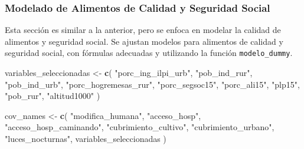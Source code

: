 \documentclass[
  12pt,
]{book}
\newenvironment{Shaded}{\begin{snugshade}}{\end{snugshade}}
\newcommand{\FunctionTok}[1]{\textcolor[rgb]{0.13,0.29,0.53}{\textbf{#1}}}
\newcommand{\NormalTok}[1]{#1}
\newcommand{\OtherTok}[1]{\textcolor[rgb]{0.56,0.35,0.01}{#1}}
\newcommand{\StringTok}[1]{\textcolor[rgb]{0.31,0.60,0.02}{#1}}
\begin{document}
\hypertarget{modelado-de-alimentos-de-calidad-y-seguridad-social}{%
\subsubsection*{Modelado de Alimentos de Calidad y Seguridad Social}\label{modelado-de-alimentos-de-calidad-y-seguridad-social}}

Esta sección es similar a la anterior, pero se enfoca en modelar la calidad de alimentos y seguridad social. Se ajustan modelos para alimentos de calidad y seguridad social, con fórmulas adecuadas y utilizando la función \texttt{modelo\_dummy}.

\begin{Shaded}
\begin{Highlighting}[]
\NormalTok{variables\_seleccionadas }\OtherTok{\textless{}{-}} \FunctionTok{c}\NormalTok{(}
  \StringTok{"porc\_ing\_ilpi\_urb"}\NormalTok{,}
  \StringTok{"pob\_ind\_rur"}\NormalTok{,}
  \StringTok{"pob\_ind\_urb"}\NormalTok{,}
  \StringTok{"porc\_hogremesas\_rur"}\NormalTok{,}
  \StringTok{"porc\_segsoc15"}\NormalTok{,}
  \StringTok{"porc\_ali15"}\NormalTok{,}
  \StringTok{"plp15"}\NormalTok{,}
  \StringTok{"pob\_rur"}\NormalTok{,}
  \StringTok{"altitud1000"}
\NormalTok{)}

\NormalTok{cov\_names }\OtherTok{\textless{}{-}} \FunctionTok{c}\NormalTok{(}
  \StringTok{"modifica\_humana"}\NormalTok{, }\StringTok{"acceso\_hosp"}\NormalTok{,}
  \StringTok{"acceso\_hosp\_caminando"}\NormalTok{, }\StringTok{"cubrimiento\_cultivo"}\NormalTok{,}
  \StringTok{"cubrimiento\_urbano"}\NormalTok{, }\StringTok{"luces\_nocturnas"}\NormalTok{,}
\NormalTok{  variables\_seleccionadas}
\NormalTok{)}


\end{Highlighting}
\end{Shaded}
\end{document}
